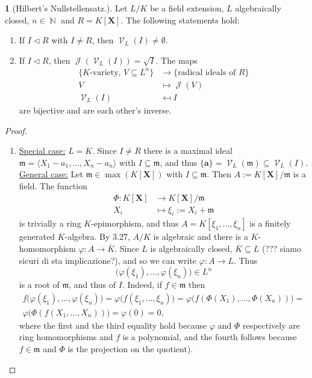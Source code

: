 \documentclass[12pt,a4paper]{report}
\theoremstyle{definition}
\theoremstyle{num.custom-title}
\newtheorem{teo_custom-title}[theorem]{} %
\DeclareMathOperator{\J}{\mathcal{J}}
\DeclareMathOperator{\N}{\mathbb{N}}
\DeclareMathOperator{\V}{\mathcal{V}}
\DeclareMathOperator{\sse}{\subseteq}
\newcommand{\ol}{\overline}
\newcommand{\m}{\mathfrak{m}}
\newcommand{\X}{\mathbf{X}}
\renewcommand{\phi}{\varphi}
\begin{document}
\begin{teo_custom-title}[Hilbert's Nullstellensatz.]
Let $L/K$ be a field extension, $L$ algebraically closed, $n \in \N$ and $R = K[\X]$. The following statements hold:
\begin{enumerate}
\item If $I \lhd R$ with $I \neq R$, then $\V_L(I) \neq \emptyset$.
\item If $I \lhd R$, then $\J(\V_L(I)) = \sqrt{I}$. The maps
\begin{align*}
\{ K\text{-variety, } V \sse L^n \} & \to \{ \text{radical ideals of } R \} \\
V & \mapsto \J(V) \\
\V_L(I) & \mapsfrom I
\end{align*}
are bijective and are each other's inverse.
\end{enumerate}
\begin{proof}\ 
\begin{enumerate}
\item \underline{Special case:} $L=K$. Since $I \neq R$ there is a maximal ideal $\m = \langle X_1-a_1, \ldots, X_n-a_n \rangle$ with $I \sse \m$, and thus $\{\mathbf{a}\} = \V_L(\m) \sse \V_L(I)$.\\
\underline{General case:} Let $\m \in \max(K[\X])$ with $I \sse \m$. Then $A := K[\X]/\m$ is a field. The function 
\begin{align*}
\Phi: K[\X] & \to K[\X]/\m \\
X_i & \mapsto \xi_i := X_i + \m
\end{align*}
is trivially a ring $K$-epimorphism, and thus $A=K[\xi_1,...,\xi_n]$ is a finitely generated $K$-algebra. By 3.27, $A/K$ is algebraic and there is a $K$-homomorphism $\phi: A \to \ol{K}$. Since $L$ is algebraically closed, $\ol{K} \sse L$ (??? siamo sicuri di sta implicazione?), and so we can write $\phi : A \to L$. Thus
\[
\Big( \phi(\xi_1), \ldots, \phi(\xi_n) \Big) \in L^n
\]
is a root of $\m$, and thus of $I$. Indeed, if $f \in \m$ then 
\begin{multline*}
f \Big( \phi(\xi_1), \ldots, \phi(\xi_n) \Big) = \phi \Big(f(\xi_1, \ldots, \xi_n) \Big) = \phi \Big(f(\Phi(X_1), \ldots, \Phi(X_n)) \Big) = \\
\phi \Big( \Phi( f(X_1, \ldots, X_n)) \Big) = \phi(0) = 0,
\end{multline*}
where the first and the third equality hold because $\phi$ and $\Phi$ respectively are ring homomorphisms and $f$ is a polynomial, and the fourth follows because $f \in \m$ and $\Phi$ is the projection on the quotient).

\end{enumerate}
\end{proof}
\end{teo_custom-title}
\end{document}
